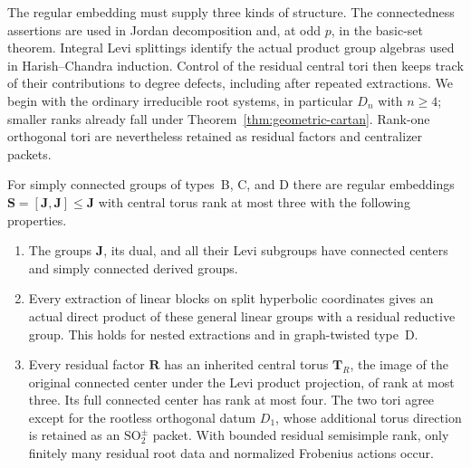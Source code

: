 The regular embedding must supply three kinds of structure.
The connectedness assertions are used in Jordan decomposition and,
at odd \(p\), in the basic-set theorem.  Integral Levi splittings
identify the actual product group algebras used in Harish--Chandra
induction.  Control of the residual central tori then keeps track of
their contributions to
degree defects, including after repeated extractions.
We begin with the ordinary irreducible root systems, in particular
\(D_n\) with \(n\geq4\); smaller ranks already fall under
Theorem~\ref{thm:geometric-cartan}.  Rank-one orthogonal tori
are nevertheless retained as residual factors and centralizer packets.

\begin{lemma}\label{fam:regular-datum}
For simply connected groups of types~B, C, and D there are regular
embeddings \(\mathbf S=[\mathbf J,\mathbf J]\leq\mathbf J\) with
central torus rank at most three with the following properties.
\begin{enumerate}
\item The groups \(\mathbf J\), its dual, and all their Levi
subgroups have connected centers and simply connected derived groups.
\item Every extraction of linear blocks on split hyperbolic
coordinates gives an actual direct product of these general linear
groups with a residual reductive group.  This holds for nested
extractions and in graph-twisted type~D.
\item Every residual factor \(\mathbf R\) has an inherited central torus
\(\mathbf T_R\), the image of the original connected center under
the Levi product projection, of rank at most three.  Its full
connected center has rank at most four.  The two tori agree except
for the rootless orthogonal datum \(D_1\), whose additional torus
direction is retained as an \(\mathrm{SO}_2^\pm\) packet.
With bounded residual semisimple rank, only finitely many residual
root data and normalized Frobenius actions occur.
\end{enumerate}
\end{lemma}

